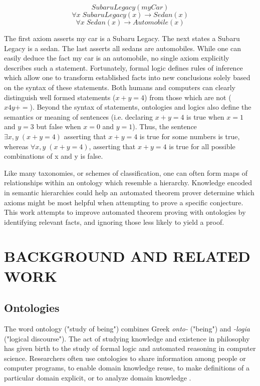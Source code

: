 \documentclass{article}
\begin{document}
\begin{singlespace}
\[SubaruLegacy(myCar)\]
\[\forall x \; SubaruLegacy(x) \rightarrow Sedan(x)\]
\[\forall x \; Sedan(x) \rightarrow Automobile(x)\]
\end{singlespace}

The first axiom asserts my car is a Subaru Legacy. The next states a Subaru Legacy is a sedan. The last asserts all sedans are automobiles. While one can easily deduce the fact my car is an automobile, no single axiom explicitly describes such a statement. Fortunately, formal logic defines rules of inference which allow one to transform established facts into new conclusions solely based on the syntax of these statements. Both humans and computers can clearly distinguish well formed statements ($x+y=4$) from those which are not ($x4y+=$). Beyond the syntax of statements, ontologies and logics also define the semantics or meaning of sentences (i.e. declaring $x+y=4$ is true when $x=1$ and $y=3$ but false when $x=0$ and $y=1$). Thus, the sentence $\exists x, y \; (x+y =4)$ asserting that $x+y=4$ is true for some numbers is true, whereas $\forall x, y \; (x+y = 4)$, asserting that $x+y =4$ is true for all possible combinations of x and y is false.

Like many taxonomies, or schemes of classification, one can often form maps of relationships within an ontology which resemble a hierarchy. Knowledge encoded in semantic hierarchies could help an automated theorem prover determine which axioms might be most helpful when attempting to prove a specific conjecture. This work attempts to improve automated theorem proving with ontologies by identifying relevant facts, and ignoring those less likely to yield a proof. 

\newpage
\vspace*{.05in}
\section{\MakeUppercase{Background and Related Work}}


\subsection{{Ontologies}}

 The word ontology ("study of being") combines Greek \textit{onto-} ("being") and \textit{-logia} ("logical discourse"). The act of studying knowledge and existence in philosophy has given birth to the study of formal logic and automated reasoning in computer science. Researchers often use ontologies to share information among people or computer programs, to enable domain knowledge reuse, to make definitions of a particular domain explicit, or to analyze domain knowledge \cite{noy2001ontology}.
 
\end{document}
